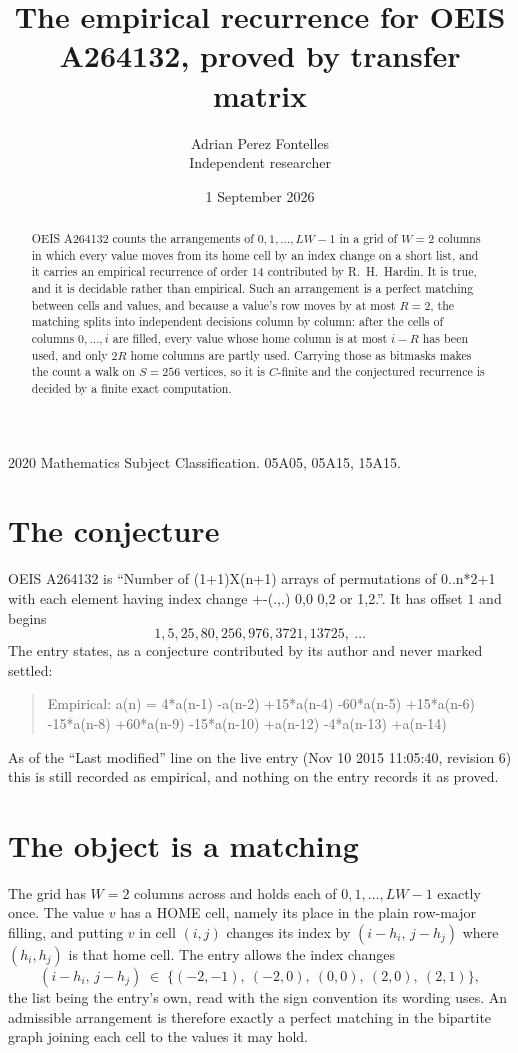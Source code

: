 \documentclass[11pt,a4paper]{article}
\title{The empirical recurrence for OEIS A264132, proved by transfer matrix}
\author{Adrian Perez Fontelles\\ \small Independent researcher}
\date{1 September 2026}
\theoremstyle{plain}
\theoremstyle{definition}
\begin{document}
\maketitle

\begin{abstract}
OEIS A264132 counts the arrangements of $0,1,\dots,LW-1$ in a grid of $W=2$ columns in which
every value moves from its home cell by an index change on a short list, and it carries an
empirical recurrence of order $14$ contributed by R.~H.~Hardin. It is true, and it is
decidable rather than empirical. Such an arrangement is a perfect matching between cells and
values, and because a value's row moves by at most $R=2$, the matching splits into
independent decisions column by column: after the cells of columns $0,\dots,i$ are filled,
every value whose home column is at most $i-R$ has been used, and only $2R$ home columns are
partly used. Carrying those as bitmasks makes the count a walk on $S=256$ vertices, so it is
$C$-finite and the conjectured recurrence is decided by a finite exact computation.
\end{abstract}

\noindent\small 2020 Mathematics Subject Classification. 05A05, 05A15, 15A15.\normalsize

\section{The conjecture}

OEIS A264132 is ``Number of (1+1)X(n+1) arrays of permutations of 0..n*2+1 with each element having index change +-(.,.) 0,0 0,2 or 1,2.''. It has offset $1$ and begins
\[
1, 5, 25, 80, 256, 976, 3721, 13725,\ \dots
\]
The entry states, as a conjecture contributed by its author and never marked settled:
\begin{quote}
Empirical: a(n) = 4*a(n-1) -a(n-2) +15*a(n-4) -60*a(n-5) +15*a(n-6) -15*a(n-8) +60*a(n-9) -15*a(n-10) +a(n-12) -4*a(n-13) +a(n-14)
\end{quote}
As of the ``Last modified'' line on the live entry (Nov 10 2015 11:05:40, revision 6) this is still
recorded as empirical, and nothing on the entry records it as proved.

\section{The object is a matching}

The grid has $W=2$ columns across and holds each of $0,1,\dots,LW-1$ exactly once. The value
$v$ has a HOME cell, namely its place in the plain row-major filling, and putting $v$ in cell
$(i,j)$ changes its index by $(i-h_i,\,j-h_j)$ where $(h_i,h_j)$ is that home cell. The entry
allows the index changes
\[
(i-h_i,\,j-h_j)\;\in\;\{(-2,-1),\ (-2,0),\ (0,0),\ (2,0),\ (2,1)\},
\]
the list being the entry's own, read with the sign convention its wording uses. An admissible
arrangement is therefore exactly a perfect matching in the bipartite graph joining each cell to
the values it may hold.
\end{document}
